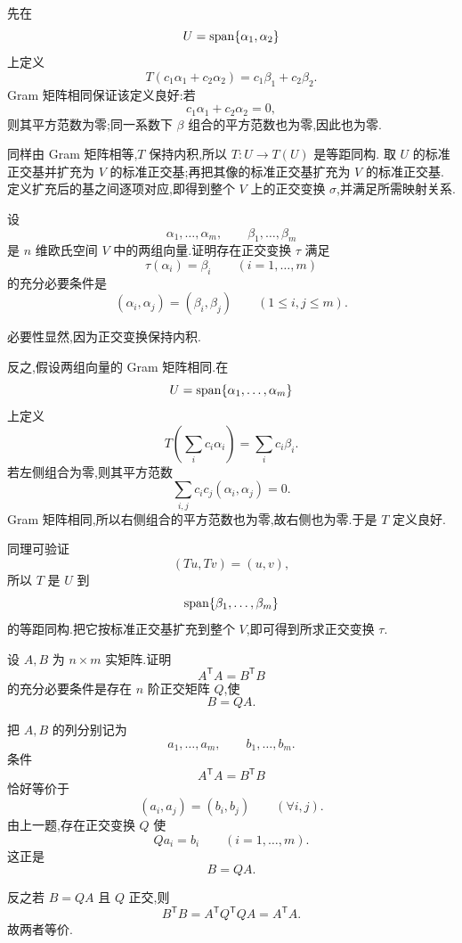 \begin{solution}
先在
\[
U=\operatorname{span}\{\alpha_1,\alpha_2\}
\]
上定义
\[
T(c_1\alpha_1+c_2\alpha_2)
=
c_1\beta_1+c_2\beta_2.
\]
Gram 矩阵相同保证该定义良好:若
\[
c_1\alpha_1+c_2\alpha_2=0,
\]
则其平方范数为零;同一系数下 $\beta$ 组合的平方范数也为零,因此也为零.

同样由 Gram 矩阵相等,$T$ 保持内积,所以 $T:U\to T(U)$ 是等距同构.
取 $U$ 的标准正交基并扩充为 $V$ 的标准正交基;再把其像的标准正交基扩充为 $V$ 的标准正交基.
定义扩充后的基之间逐项对应,即得到整个 $V$ 上的正交变换 $\sigma$,并满足所需映射关系.
\end{solution}


\begin{example}[\markstar]
设
\[
\alpha_1,\ldots,\alpha_m,
\qquad
\beta_1,\ldots,\beta_m
\]
是 $n$ 维欧氏空间 $V$ 中的两组向量.证明存在正交变换 $\tau$ 满足
\[
\tau(\alpha_i)=\beta_i
\qquad(i=1,\ldots,m)
\]
的充分必要条件是
\[
(\alpha_i,\alpha_j)
=
(\beta_i,\beta_j)
\qquad
(1\le i,j\le m).
\]
\end{example}
\exampleblank

\begin{solution}
必要性显然,因为正交变换保持内积.

反之,假设两组向量的 Gram 矩阵相同.在
\[
U=\operatorname{span}\{\alpha_1,\ldots,\alpha_m\}
\]
上定义
\[
T\left(\sum_i c_i\alpha_i\right)
=
\sum_i c_i\beta_i.
\]
若左侧组合为零,则其平方范数
\[
\displaystyle\sum_{i,j}c_ic_j(\alpha_i,\alpha_j)=0.
\]
Gram 矩阵相同,所以右侧组合的平方范数也为零,故右侧也为零.于是 $T$ 定义良好.

同理可验证
\[
(Tu,Tv)=(u,v),
\]
所以 $T$ 是 $U$ 到
\[
\operatorname{span}\{\beta_1,\ldots,\beta_m\}
\]
的等距同构.把它按标准正交基扩充到整个 $V$,即可得到所求正交变换 $\tau$.
\end{solution}


\begin{example}
设 $A,B$ 为 $n\times m$ 实矩阵.证明
\[
A^{\mathsf T}A=B^{\mathsf T}B
\]
的充分必要条件是存在 $n$ 阶正交矩阵 $Q$,使
\[
B=QA.
\]
\end{example}
\exampleblank

\begin{solution}
把 $A,B$ 的列分别记为
\[
a_1,\ldots,a_m,
\qquad
b_1,\ldots,b_m.
\]
条件
\[
A^{\mathsf T}A=B^{\mathsf T}B
\]
恰好等价于
\[
(a_i,a_j)=(b_i,b_j)
\qquad
(\forall i,j).
\]
由上一题,存在正交变换 $Q$ 使
\[
Qa_i=b_i
\qquad(i=1,\ldots,m).
\]
这正是
\[
B=QA.
\]

反之若 $B=QA$ 且 $Q$ 正交,则
\[
B^{\mathsf T}B
=A^{\mathsf T}Q^{\mathsf T}QA
=A^{\mathsf T}A.
\]
故两者等价.
\end{solution}
